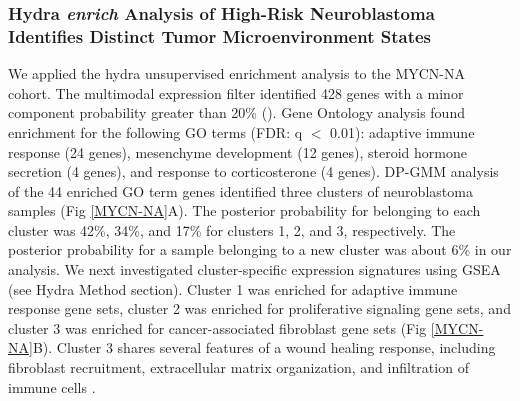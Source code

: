 \documentclass[10pt,letterpaper]{article}
\begin{document}
\subsubsection*{Hydra \textit{enrich} Analysis of High-Risk Neuroblastoma Identifies Distinct Tumor Microenvironment States}
We applied the hydra unsupervised enrichment analysis to the MYCN-NA cohort. The multimodal expression filter identified 428 genes with a minor component probability greater than 20\% (). Gene Ontology analysis found enrichment for the following GO terms (FDR: q $<$ 0.01): adaptive immune response (24 genes), mesenchyme development (12 genes), steroid hormone secretion (4 genes), and response to corticosterone (4 genes). DP-GMM analysis of the 44 enriched GO term genes identified three clusters of neuroblastoma samples (Fig \ref{MYCN-NA}A). The posterior probability for belonging to each cluster was 42\%, 34\%, and 17\% for clusters 1, 2, and 3, respectively. The posterior probability for a sample belonging to a new cluster was about 6\% in our analysis. We next investigated cluster-specific expression signatures using GSEA (see Hydra Method section). Cluster 1 was enriched for adaptive immune response gene sets, cluster 2 was enriched for proliferative signaling gene sets, and cluster 3 was enriched for cancer-associated fibroblast gene sets (Fig \ref{MYCN-NA}B). Cluster 3 shares several features of a wound healing response, including fibroblast recruitment, extracellular matrix organization, and infiltration of immune cells \cite{fosterEvolvingRelationshipWound}. 
\end{document}

